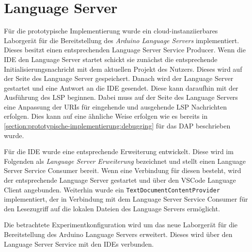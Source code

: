 \section{Language Server}\label{section:prototypische-implementierung:language-server}


Für die prototypische Implementierung wurde ein cloud-instanziierbares Laborgerät für die Bereitstellung des \textit{Arduino Language Servers} \cite{noauthor_arduino-language-server_2025} implementiert. Dieses besitzt einen entsprechenden Language Server Service Producer. Wenn die IDE den Language Server startet schickt sie zunächst die entsprechende Initialisierungsnachricht mit dem aktuellen Projekt des Nutzers. Dieses wird auf der Seite des Language Server gespeichert. Danach wird der Language Server gestartet und eine Antwort an die IDE gesendet. Diese kann daraufhin mit der Ausführung des \ac{LSP} beginnen. Dabei muss auf der Seite des Language Servers eine Anpassung der URIs für eingehende und ausgehende \ac{LSP} Nachrichten erfolgen. Dies kann auf eine ähnliche Weise erfolgen wie es bereits in \autoref{section:prototypische-implementierung:debugging} für das \ac{DAP} beschrieben wurde.

Für die IDE wurde eine entsprechende Erweiterung entwickelt. Diese wird im Folgenden als \textit{Language Server Erweiterung} bezeichnet und stellt einen Language Server Service Consumer bereit. Wenn eine Verbindung für diesen besteht, wird der entsprechende Language Server gestartet und über den VSCode Language Client angebunden. Weiterhin wurde ein \texttt{TextDocumentContentProvider} implementiert, der in Verbindung mit dem Language Server Service Consumer für den Lesezugriff auf die lokalen Dateien des Language Servers ermöglicht.

Die betrachtete Experimentkonfiguration wird um das neue Laborgerät für die Bereitstellung des Arduino Language Servers erweitert. Dieses wird über den Language Server Service mit den IDEs verbunden.